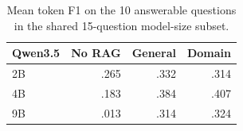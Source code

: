 \begin{table}[t]
\centering
\setlength{\tabcolsep}{4pt}
\begin{tabular}{lrrr}
\toprule
Qwen3.5 & No RAG & General & Domain \\
\midrule
2B & .265 & .332 & .314 \\
4B & .183 & .384 & .407 \\
9B & .013 & .314 & .324 \\
\bottomrule
\end{tabular}
\caption{Mean token F1 on the 10 answerable questions in the shared 15-question model-size subset.}
\label{tab:shared}
\end{table}
